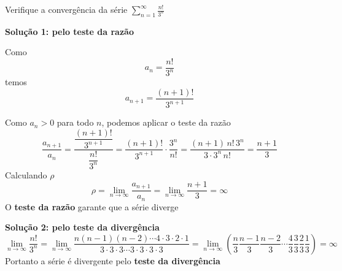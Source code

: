 \documentclass[a4paper,12pt,fleqn]{article}
\begin{document}
Verifique a convergência da série
\(
  \sum_{n=1}^{\infty}\frac{n!}{3^n}
\)
\begin{answer}
  \textbf{Solução 1: pelo teste da razão}

  Como
  \[
    a_n=\frac{n!}{3^n}
  \]
  temos
  \[
    a_{n+1}
    = \frac{(n+1)!}{3^{n+1}}
  \]

  Como \(a_n>0\) para todo \(n\), podemos aplicar o teste da razão
  \[
    \frac{a_{n+1}}{a_n}
    = \frac{\dfrac{(n+1)!}{3^{n+1}}}{\dfrac{n!}{3^n}}
    = \frac{(n+1)!}{3^{n+1}}\cdot\frac{3^n}{n!}
    = \frac{(n+1)\,n!\,3^n}{3\cdot 3^n\,n!}
    = \frac{n+1}{3}
  \]
  Calculando $\rho$
  \[
    \rho
    = \lim_{n\to\infty} \frac{a_{n+1}}{a_n}
    = \lim_{n\to\infty} \frac{n+1}{3}
    = \infty
  \]
  O \textbf{teste da razão} garante que a série diverge

  \bigskip
  \bigskip
  \textbf{Solução 2: pelo teste da divergência}
  \[
    \lim_{n\to\infty} \frac{n!}{3^n}
    = \lim_{n\to\infty} \frac{n(n-1)(n-2) \cdots 4 \cdot 3 \cdot 2 \cdot 1 }
                             {3 \cdot 3 \cdot 3 \cdots 3 \cdot 3 \cdot 3 \cdot 3}
   = \lim_{n\to\infty}
    \left(
      \frac{n}{3}
      \frac{n-1}{3}
      \frac{n-2}{3}
      \cdots
      \frac{4}{3}
      \frac{3}{3}
      \frac{2}{3}
      \frac{1}{3}
    \right)
    = \infty
  \]
  Portanto a série é divergente pelo \textbf{teste da divergência}

\end{answer}

\end{document}
